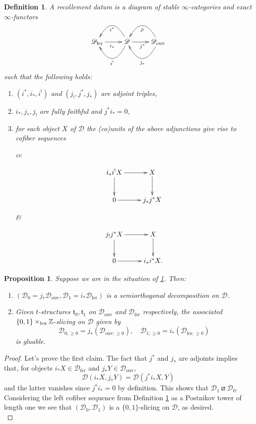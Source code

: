 \documentclass{article}
\newtheorem{prop}[thm]{Proposition}
\newtheorem{defn}[thm]{Definition}
\theoremstyle{definition}
\newcommand{\Z}{\mathbb{Z}}
\newcommand{\tee}{\mathfrak{t}}
\newcommand{\orth}{\boxslash}
\newcommand{\lex}{\times_{\textnormal{lex}}}
\begin{document}
\begin{defn}\label{recoll}
  A \emph{recollement datum} is a diagram of stable $\infty$-categories and exact $\infty$-functors 
\[
\xymatrix{
  \mathscr{D}_{\mathrm{fer}}\ar[r]_{i_*}  & \mathscr{D} \ar@/^2pc/[l]^{i^!} \ar[r]_{j^*} \ar@/_2pc/[l]^{i^*} & \mathscr{D}_{\mathrm{ouv}} \ar@/^2pc/[l]^{j_*} \ar@/_2pc/[l]^{j_!}\\
}
\]
such that the following holds:
\begin{enumerate}
\item $(i^*,i_*,i^!)$ and $(j_!,j^*,j_*)$ are adjoint triples,
\item $i_*, j_*, j_!$ are fully faithful and $j^*i_* =0$,
\item for each object $X$ of $\mathscr{D}$ the (co)units of the above adjunctions give rise to cofiber sequences \\
  
\begin{tabular}{cc}
 \begin{minipage}{2in}   
\[
\xymatrix{
i_*i^!X\ar[r]\ar[d] & X\ar[d] \\
0\ar[r]& j_*j^*X
}
\]
 \end{minipage}
&
\begin{minipage}{2in}   
\[
\xymatrix{
j_!j^*X\ar[r]\ar[d] & X\ar[d] \\
0\ar[r]& i_*i^*X.
}
\]
 \end{minipage}
\end{tabular}
\end{enumerate} 
\end{defn}

\begin{prop}
  Suppose we are in the situation of \ref{recoll}. Then:
  \begin{enumerate}
  \item $(\mathscr{D}_0=j_*\mathscr{D}_{\mathrm{ouv}}, \mathscr{D}_1=i_*\mathscr{D}_{\mathrm{fer}})$ is a semiorthogonal decomposition on $\mathscr{D}$.
  \item Given $t$-structures $\tee_0, \tee_1$ on $\mathscr{D}_{\mathrm{ouv}}$ and $\mathscr{D}_{\mathrm{fer}}$ respectively, the associated $\{0,1\}\lex \Z$-slicing on $\mathscr{D}$ given by
  \[
  \mathscr{D}_{0;\geq 0}=j_*(\mathscr{D}_{\mathrm{ouv};\geq 0}), \quad \mathscr{D}_{1;\geq 0}=i_*(\mathscr{D}_{\mathrm{fer};\geq 0})
  \]
   is gluable. 
  \end{enumerate}
\end{prop}

\begin{proof}
  Let's prove the first claim. The fact that $j^*$ and $j_*$ are adjoints implies that, for objects $i_*X \in \mathscr{D}_{\mathrm{fer}}$ and $j_*Y \in \mathscr{D}_{\mathrm{ouv}}$, $$\mathscr{D}(i_*X,j_*Y)=\mathscr{D}(j^*i_*X,Y)$$
  and the latter vanishes since $j^*i_*=0$ by definition. This shows that $\mathscr{D}_1 \orth \mathscr{D}_0$. Considering the left cofiber sequence from Definition \ref{recoll} as a Postnikov tower of length one we see that $(\mathscr{D}_0,\mathscr{D}_1)$ is a $\{0,1\}$-slicing on $\mathscr{D}$, as desired. \\

  
\end{proof}
\end{document}
